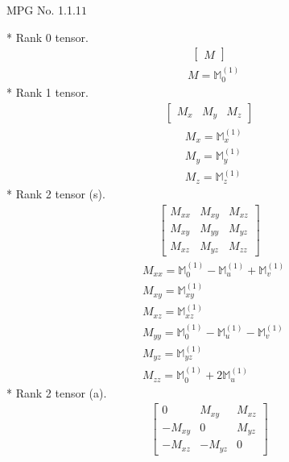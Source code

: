 \documentclass[fleqn,8pt,landscape]{jsarticle}
\begin{document}
\setcounter{MaxMatrixCols}{32}

\renewcommand{\tablename}{Table~}
\renewcommand{\figurename}{Figure~}
\begin{center}
\LARGE
MPG No. 1.1.1\quad$1$
\end{center}
* Rank 0 tensor.
\begin{align*}
\begin{bmatrix} M \end{bmatrix}
\end{align*}
\begin{align*}
& M = \mathbb{M}_{0}^{(1)}
\end{align*}
* Rank 1 tensor.
\begin{align*}
\begin{bmatrix} M_{x} & M_{y} & M_{z} \end{bmatrix}
\end{align*}
\begin{align*}
& M_{x} = \mathbb{M}_{x}^{(1)} \\
& M_{y} = \mathbb{M}_{y}^{(1)} \\
& M_{z} = \mathbb{M}_{z}^{(1)}
\end{align*}
* Rank 2 tensor (s).
\begin{align*}
\begin{bmatrix} M_{xx} & M_{xy} & M_{xz} \\ M_{xy} & M_{yy} & M_{yz} \\ M_{xz} & M_{yz} & M_{zz} \end{bmatrix}
\end{align*}
\begin{align*}
& M_{xx} = \mathbb{M}_{0}^{(1)} - \mathbb{M}_{u}^{(1)} + \mathbb{M}_{v}^{(1)} \\
& M_{xy} = \mathbb{M}_{xy}^{(1)} \\
& M_{xz} = \mathbb{M}_{xz}^{(1)} \\
& M_{yy} = \mathbb{M}_{0}^{(1)} - \mathbb{M}_{u}^{(1)} - \mathbb{M}_{v}^{(1)} \\
& M_{yz} = \mathbb{M}_{yz}^{(1)} \\
& M_{zz} = \mathbb{M}_{0}^{(1)} + 2 \mathbb{M}_{u}^{(1)}
\end{align*}
* Rank 2 tensor (a).
\begin{align*}
\begin{bmatrix} 0 & M_{xy} & M_{xz} \\ - M_{xy} & 0 & M_{yz} \\ - M_{xz} & - M_{yz} & 0 \end{bmatrix}
\end{align*}
\end{document}
